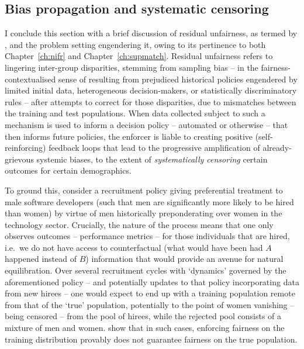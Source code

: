 \subsection{Bias propagation and systematic censoring}\label{ssec:residual-unfairness}
I conclude this section with a brief discussion of residual unfairness, as termed by
\citet{kallus2018residual}, and the problem setting engendering it, owing to its pertinence to both
Chapter~\ref{ch:nifr} and Chapter~\ref{ch:supmatch}.
%
Residual unfairness refers to lingering inter-group disparities, stemming from sampling bias -- in
the fairness-contextualised sense of resulting from prejudiced historical policies engendered by
limited initial data, heterogeneous decision-makers, or statistically discriminatory rules -- after
attempts to correct for those disparities, due to mismatches between the training and test
populations.
%
When data collected subject to such a mechanism is used to inform a decision policy -- automated or
otherwise -- that then informs future policies, the enforcer is liable to creating positive
(self-reinforcing) feedback loops that lead to the progressive amplification of already-grievous
systemic biases, to the extent of \emph{systematically censoring} certain outcomes for certain
demographics.

%
To ground this, consider a recruitment policy giving preferential treatment to male software
developers (such that men are significantly more likely to be hired than women) by virtue of men
historically preponderating over women in the technology sector.
%
Crucially, the nature of the process means that one only observes outcomes -- performance metrics
-- for those individuals that are hired, i.e.\ we do not have access to counterfactual (what would
have been had \(A\) happened instead of \(B\)) information that would provide an avenue for natural
equilibration.
%
Over several recruitment cycles with `dynamics' governed by the aforementioned policy -- and
potentially updates to that policy incorporating data from new hirees -- one would expect to end up
with a training population remote from that of the `true' population, potentially to the point of
women vanishing -- being censored -- from the pool of hirees, while the rejected pool consists of a
mixture of men and women.
%
\cite{kallus2018residual} show that in such cases, enforcing fairness on the training distribution
provably does not guarantee fairness on the true population.
%


